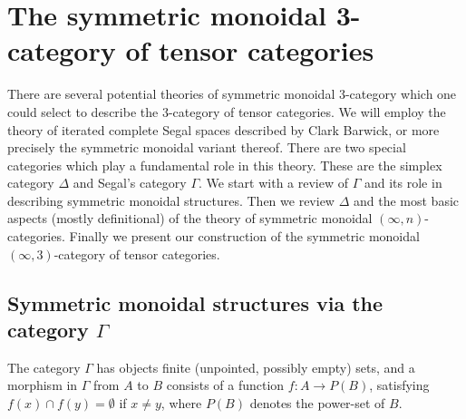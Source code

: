 \documentclass{amsart}
\begin{document}
 


\section{The symmetric monoidal 3-category of tensor categories}



There are several potential theories of symmetric monoidal 3-category which one could select to describe the 3-category of tensor categories. We will employ the theory of iterated complete Segal spaces described by Clark Barwick,  or more precisely the symmetric monoidal variant thereof. There are two special categories which play a fundamental role in this theory. These are the simplex category $\Delta$ and Segal's category $\Gamma$. We start with a review of $\Gamma$ and its role in describing symmetric monoidal structures. Then we review $\Delta$ and the most basic aspects (mostly definitional) of the theory of symmetric monoidal $(\infty,n)$-categories. Finally we present our construction of the symmetric monoidal $(\infty,3)$-category of tensor categories. 

\subsection{Symmetric monoidal structures via the category $\Gamma$}

\begin{definition}
	The category  $\Gamma$ has objects finite (unpointed, possibly empty) sets, and a morphism in $\Gamma$ from $A$ to $B$ consists of a function $f: A \to P(B)$, satisfying $f(x) \cap f(y) = \emptyset$ if $x \neq y$, where $P(B)$ denotes the power-set of $B$. 
\end{definition}
\end{document}
